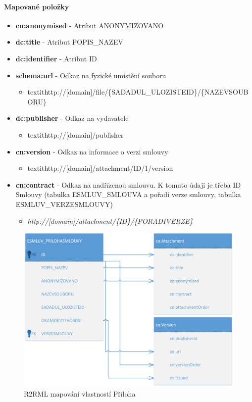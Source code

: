 \paragraph*{Mapované položky}
\begin{itemize}
\item \textbf{cn:anonymised} - Atribut ANONYMIZOVANO
\item \textbf{dc:title} - Atribut POPIS\_NAZEV
\item \textbf{dc:identifier} - Atribut ID
\item \textbf{schema:url} - Odkaz na fyzické umístění souboru
	\begin{itemize}
	\item textit{http://[domain]/file/\{SADADUL\_ULOZISTEID\}/\{NAZEVSOUBORU\}}
	\end{itemize}
\item \textbf{dc:publisher} - Odkaz na vydavatele
	\begin{itemize}
	\item textit{http://[domain]/publisher}
	\end{itemize}
\item \textbf{cn:version} - Odkaz na informace o verzi smlouvy
	\begin{itemize}
	\item textit{http://[domain]/attachment/{ID}/1/version}
	\end{itemize}
\item \textbf{cn:contract} - Odkaz na nadřízenou smlouvu. K tomuto údaji je třeba ID Smlouvy (tabulka ESMLUV\_SMLOUVA a pořadí verze smlouvy, tabulka ESMLUV\_VERZESMLOUVY)
	\begin{itemize}
	\item \textit{http://[domain]/attachment/\{ID\}/\{PORADIVERZE\}}
	\end{itemize}
\end{itemize}

\begin{figure}[H]
\centerline{\includegraphics[width=\textwidth]{img/mapAttachment.eps}}
\caption{R2RML mapování vlastností Příloha}
\label{obr:mapAttachment}
\end{figure}

